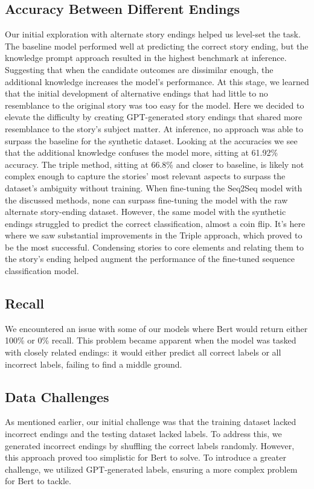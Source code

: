\documentclass{article}
\begin{document}
\begin{multicols}{2}
\subsection{Accuracy Between Different Endings}
Our initial exploration with alternate story endings helped us level-set the task. The baseline model performed well at predicting the correct story ending, but the knowledge prompt approach resulted in the highest benchmark at inference. Suggesting that when the candidate outcomes are dissimilar enough, the additional knowledge increases the model’s performance. At this stage, we learned that the initial development of alternative endings that had little to no resemblance to the original story was too easy for the model. Here we decided to elevate the difficulty by creating GPT-generated story endings that shared more resemblance to the story’s subject matter. At inference, no approach was able to surpass the baseline for the synthetic dataset. Looking at the accuracies we see that the additional knowledge confuses the model more, sitting at 61.92\% accuracy. The triple method, sitting at 66.8\% and closer to baseline, is likely not complex enough to capture the stories’ most relevant aspects to surpass the dataset’s ambiguity without training. When fine-tuning the Seq2Seq model with the discussed methods, none can surpass fine-tuning the model with the raw alternate story-ending dataset.  However, the same model with the synthetic endings struggled to predict the correct classification, almost a coin flip. It’s here where we saw substantial improvements in the Triple approach, which proved to be the most successful. Condensing stories to core elements and relating them to the story’s ending helped augment the performance of the fine-tuned sequence classification model.

\subsection{Recall}
We encountered an issue with some of our models where Bert would return either 100\% or 0\% recall. This problem became apparent when the model was tasked with closely related endings: it would either predict all correct labels or all incorrect labels, failing to find a middle ground. 

\subsection{Data Challenges}
As mentioned earlier, our initial challenge was that the training dataset lacked incorrect endings and the testing dataset lacked labels. To address this, we generated incorrect endings by shuffling the correct labels randomly. However, this approach proved too simplistic for Bert to solve. To introduce a greater challenge, we utilized GPT-generated labels, ensuring a more complex problem for Bert to tackle. 


\end{multicols}
\end{document}
